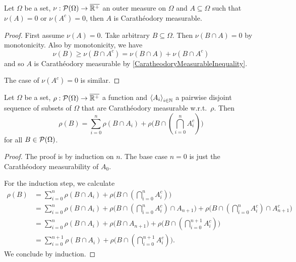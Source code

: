 \begin{lemma} \label{nullSetsCaratheodoryMeasurable}
Let $\Omega$ be a set, $\nu: \operatorname{\mathcal{P}}(\Omega)\to \overline{\mathbb{R}^+}$ an outer measure on $\Omega$ and $A\subseteq \Omega$ such that $\nu(A) = 0$ or $\nu(A^c) = 0$, then $A$ is Carathéodory measurable.
\end{lemma}
\begin{proof}
First assume $\nu(A) = 0$. Take arbitrary $B\subseteq \Omega$. Then $\nu(B\cap A) = 0$ by monotonicity. Also by monotonicity, we have
\[ \nu(B) \geq \nu(B\cap A^c) = \nu(B\cap A) + \nu(B\cap A^c) \]
and so $A$ is Carathéodory measurable by \ref{CaratheodoryMeasurableInequality}.

The case of $\nu(A^c) = 0$ is similar.
\end{proof}

\begin{lemma} \label{caratheodoryExtensionLemma}
Let $\Omega$ be a set, $\rho: \operatorname{\mathcal{P}}(\Omega) \to \overline{\mathbb{R}^+}$ a function and $\left\langle A_i \right\rangle_{i\in\mathbb{N}}$ a pairwise disjoint sequence of subsets of $\Omega$ that are Carathéodory measurable w.r.t.\ $\rho$. Then
\[ \rho(B) = \sum_{i=0}^n \rho(B\cap A_i) + \rho\big(B\cap (\bigcap_{i=0}^nA_i^c)\big) \]
for all $B\in \operatorname{\mathcal{P}}(\Omega)$.
\end{lemma}
\begin{proof}
The proof is by induction on $n$. The base case $n=0$ is just the Carathéodory measurability of $A_0$.

For the induction step, we calculate
\begin{align*}
\rho(B) &= \sum_{i=0}^n \rho(B\cap A_i) + \rho\big(B\cap (\bigcap_{i=0}^nA_i^c)\big) \\
&= \sum_{i=0}^n \rho(B\cap A_i) + \rho\big(B\cap (\bigcap_{i=0}^nA_i^c)\cap A_{n+1}\big) + \rho\big(B\cap (\bigcap_{i=0}^nA_i^c)\cap A_{n+1}^c\big) \\
&= \sum_{i=0}^n \rho(B\cap A_i) + \rho\big(B\cap A_{n+1}\big) + \rho\big(B\cap (\bigcap_{i=0}^{n+1}A_i^c)\big) \\
&= \sum_{i=0}^{n+1}\rho(B\cap A_i) + \rho\big(B\cap (\bigcap_{i=0}^{n+1}A_i^c)\big).
\end{align*}
We conclude by induction.
\end{proof}

